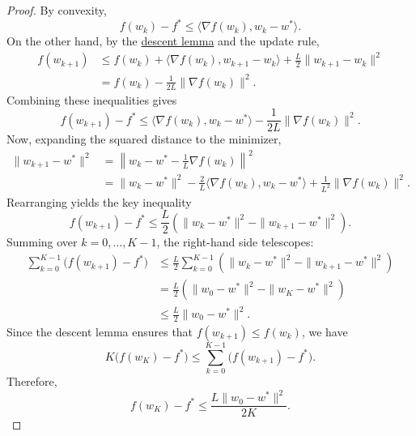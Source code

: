 	\begin{proof}
		By convexity,
		\begin{equation}
			f(w_k) - f^\ast \leq \langle \nabla f(w_k), w_k - w^\ast \rangle.
		\end{equation}
		On the other hand, by the \hyperref[thm:descent-lemma]{descent lemma} and the update rule,
		\begin{align}
			f(w_{k+1}) 
				&\leq f(w_k) + \langle \nabla f(w_k), w_{k+1} - w_k \rangle + \frac{L}{2} \|w_{k+1} - w_k\|^2 \\
				&= f(w_k) - \frac{1}{2L} \|\nabla f(w_k)\|^2.
		\end{align}
		Combining these inequalities gives
		\begin{equation}
			f(w_{k+1}) - f^\ast \leq \langle \nabla f(w_k), w_k - w^\ast \rangle - \frac{1}{2L} \|\nabla f(w_k)\|^2.
		\end{equation}
		Now, expanding the squared distance to the minimizer,
		\begin{align}
			\|w_{k+1} - w^\ast\|^2
			&= \left\|w_k - w^\ast - \frac{1}{L}\nabla f(w_k)\right\|^2 \\
			&= \|w_k - w^\ast\|^2 - \frac{2}{L} \langle \nabla f(w_k), w_k - w^\ast \rangle + \frac{1}{L^2}\|\nabla f(w_k)\|^2.
		\end{align}
		Rearranging yields the key inequality
		\begin{equation}
			f(w_{k+1}) - f^\ast \leq \frac{L}{2} \left( \|w_k - w^\ast\|^2 - \|w_{k+1} - w^\ast\|^2 \right).
		\end{equation}
		Summing over $k = 0, \ldots, K-1$, the right-hand side telescopes:
		\begin{align}
			\sum_{k=0}^{K-1} \big(f(w_{k+1}) - f^\ast\big)
				&\leq \frac{L}{2} \sum_{k=0}^{K-1} \left( \|w_k - w^\ast\|^2 - \|w_{k+1} - w^\ast\|^2 \right) \\
				&= \frac{L}{2} \left( \|w_0 - w^\ast\|^2 - \|w_K - w^\ast\|^2 \right) \\
				&\leq \frac{L}{2}\|w_0 - w^\ast\|^2.
		\end{align}
		Since the descent lemma ensures that
		$f(w_{k+1}) \leq f(w_k)$, we have
		\begin{equation}
			K\big(f(w_K) - f^\ast\big) \leq \sum_{k=0}^{K-1}\big(f(w_{k+1}) - f^\ast\big).
		\end{equation}
		Therefore,
		\begin{equation}
			f(w_K) - f^\ast
			\leq \frac{L\|w_0 - w^\ast\|^2}{2K}.
		\end{equation}
	\end{proof}

